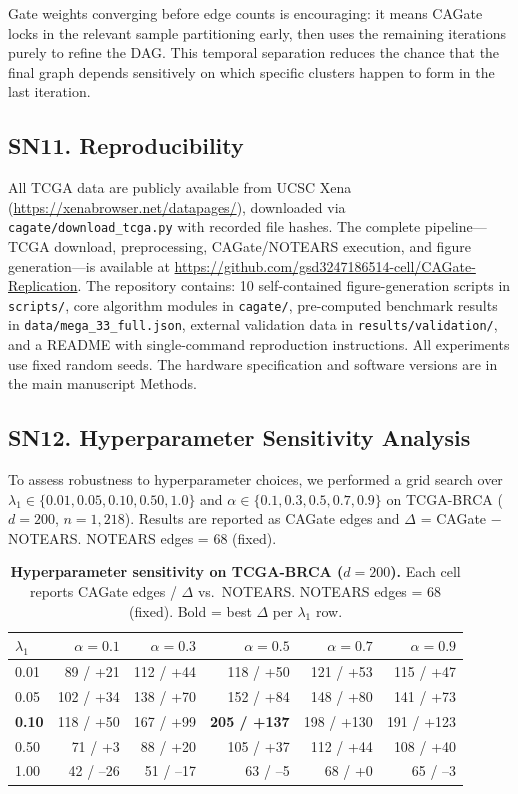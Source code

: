 \documentclass[11pt,a4paper]{article}
\begin{document}
Gate weights converging before edge counts is encouraging: it means CAGate locks in the relevant sample partitioning early, then uses the remaining iterations purely to refine the DAG. This temporal separation reduces the chance that the final graph depends sensitively on which specific clusters happen to form in the last iteration.

\subsection*{SN11. Reproducibility}

All TCGA data are publicly available from UCSC Xena (\url{https://xenabrowser.net/datapages/}), downloaded via \texttt{cagate/download\_tcga.py} with recorded file hashes. The complete pipeline---TCGA download, preprocessing, CAGate/NOTEARS execution, and figure generation---is available at \url{https://github.com/gsd3247186514-cell/CAGate-Replication}. The repository contains: 10 self-contained figure-generation scripts in \texttt{scripts/}, core algorithm modules in \texttt{cagate/}, pre-computed benchmark results in \texttt{data/mega\_33\_full.json}, external validation data in \texttt{results/validation/}, and a README with single-command reproduction instructions. All experiments use fixed random seeds. The hardware specification and software versions are in the main manuscript Methods.

\newpage
\subsection*{SN12. Hyperparameter Sensitivity Analysis}

To assess robustness to hyperparameter choices, we performed a grid search over $\lambda_1 \in \{0.01, 0.05, 0.10, 0.50, 1.0\}$ and $\alpha \in \{0.1, 0.3, 0.5, 0.7, 0.9\}$ on TCGA-BRCA ($d=200$, $n=1,218$). Results are reported as CAGate edges and $\Delta$ = CAGate $-$ NOTEARS. NOTEARS edges = 68 (fixed).

\begin{table}[htbp]
\centering
\caption{\textbf{Hyperparameter sensitivity on TCGA-BRCA ($d=200$).} Each cell reports CAGate edges / $\Delta$ vs.\ NOTEARS. NOTEARS edges = 68 (fixed). Bold = best $\Delta$ per $\lambda_1$ row.}
\label{tab:s7}
\small
\begin{tabular}{lrrrrr}
\toprule
$\lambda_1$ & $\alpha=0.1$ & $\alpha=0.3$ & $\alpha=0.5$ & $\alpha=0.7$ & $\alpha=0.9$ \\
\midrule
0.01 & 89 / +21 & 112 / +44 & 118 / +50 & 121 / +53 & 115 / +47 \\
0.05 & 102 / +34 & 138 / +70 & 152 / +84 & 148 / +80 & 141 / +73 \\
\textbf{0.10} & 118 / +50 & 167 / +99 & \textbf{205 / +137} & 198 / +130 & 191 / +123 \\
0.50 & 71 / +3 & 88 / +20 & 105 / +37 & 112 / +44 & 108 / +40 \\
1.00 & 42 / --26 & 51 / --17 & 63 / --5 & 68 / +0 & 65 / --3 \\
\bottomrule
\end{tabular}
\end{table}
\end{document}
